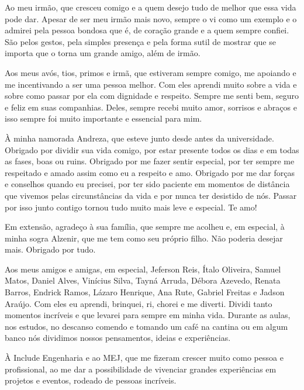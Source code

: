 \begin{trivlist}
  \item Ao meu irmão, que cresceu comigo e a quem desejo tudo de melhor que essa vida pode dar. Apesar de ser meu irmão mais novo, sempre o vi como um exemplo e o admirei pela pessoa bondosa que é, de coração grande e a quem sempre confiei. São pelos gestos, pela simples presença e pela forma sutil de mostrar que se importa que o torna um grande amigo, além de irmão.

  \item Aos meus avós, tios, primos e irmã, que estiveram sempre comigo, me apoiando e me incentivando a ser uma pessoa melhor. Com eles aprendi muito sobre a vida e sobre como passar por ela com dignidade e respeito. Sempre me senti bem, seguro e feliz em suas companhias. Deles, sempre recebi muito amor, sorrisos e abraços e isso sempre foi muito importante e essencial para mim.
  
  \item À minha namorada Andreza, que esteve junto desde antes da universidade. Obrigado por dividir sua vida comigo, por estar presente todos os dias e em todas as fases, boas ou ruins. Obrigado por me fazer sentir especial, por ter sempre me respeitado e amado assim como eu a respeito e amo. Obrigado por me dar forças e conselhos quando eu precisei, por ter sido paciente em momentos de distância que vivemos pelas circunstâncias da vida e por nunca ter desistido de nós. Passar por isso junto contigo tornou tudo muito mais leve e especial. Te amo!

  \item Em extensão, agradeço à sua família, que sempre me acolheu e, em especial, à minha sogra Alzenir, que me tem como seu próprio filho. Não poderia desejar mais. Obrigado por tudo.
  
  \item Aos meus amigos e amigas, em especial, Jeferson Reis, Ítalo Oliveira, Samuel Matos, Daniel Alves, Vinícius Silva, Tayná Arruda, Débora Azevedo, Renata Barros, Endrick Ramos, Lázaro Henrique, Ana Rute, Gabriel Freitas e Jadson Araújo. Com eles eu aprendi, brinquei, ri, chorei e me diverti. Dividi tanto momentos incríveis e que levarei para sempre em minha vida. Durante as aulas, nos estudos, no descanso comendo e tomando um café na cantina ou em algum banco nós dividimos nossos pensamentos, ideias e experiências.

  \item À Include Engenharia e ao MEJ, que me fizeram crescer muito como pessoa e profissional, ao me dar a possibilidade de vivenciar grandes experiências em projetos e eventos, rodeado de pessoas incríveis.


\end{trivlist}
